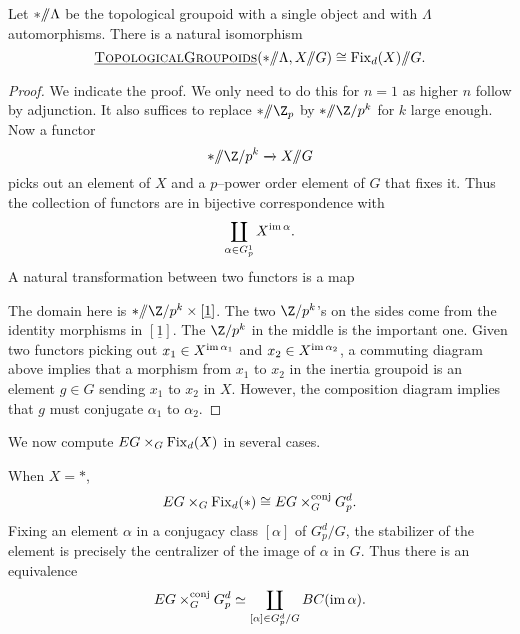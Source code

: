 \begin{lemma} \label{inertialemma}
Let \(\ast /\!\!/ \Lambda\) be the topological groupoid with a single object and with \(\Lambda\) automorphisms. There is a natural isomorphism 
\[
\operatorname{\underline{\smash{\normalfont\textsc{TopologicalGroupoids}}}}(\ast /\!\!/ \Lambda, X /\!\!/ G) \cong \operatorname{Fix}_d(X) /\!\!/ G.
\]
\end{lemma} 
\begin{proof}
We indicate the proof. We only need to do this for \(n=1\) as higher \(n\) follow by adjunction. It also suffices to replace \(\ast \mmod \Z_p\) by \(\ast \mmod \Z/p^k\) for \(k\) large enough. Now a functor
\[
\ast \mmod \Z/p^k \xrightarrow{} X \mmod G
\]
picks out an element of \(X\) and a \(p\)--power order element of \(G\) that fixes it. Thus the collection of functors are in bijective correspondence with
\[
\coprod_{\alpha \in G^{1}_{p}} X^{\operatorname{im} \alpha}.
\]
A natural transformation between two functors is a map
\begin{center}
\end{center}
The domain here is \(\ast \mmod \Z/p^k \times [\underline{1}]\). The two \(\Z/p^k\)'s on the sides come from the identity morphisms in \([\underline{1}]\). The \(\Z/p^k\) in the middle is the important one. Given two functors picking out \(x_1 \in X^{\operatorname{im} \alpha_1}\) and \(x_2 \in X^{\operatorname{im} \alpha_2}\), a commuting diagram above implies that a morphism from \(x_1\) to \(x_2\) in the inertia groupoid is an element \(g \in G\) sending \(x_1\) to \(x_2\) in \(X\). However, the composition diagram implies that \(g\) must conjugate \(\alpha_1\) to \(\alpha_2\).
\end{proof}

We now compute \(EG \times_G \operatorname{Fix}_d(X)\) in several cases.

\begin{example} \label{xapoint2}
When \(X = \ast\),
\[
EG \times_G \operatorname{Fix}_d(\ast) \cong EG \times_{G}^{\text{conj}} G_{p}^{d}.
\]
Fixing an element \(\alpha\) in a conjugacy class \([\alpha]\) of \(G_{p}^{d}/G\), the stabilizer of the element is precisely the centralizer of the image of \(\alpha\) in \(G\). Thus there is an equivalence
\[
EG \times_{G}^{\text{conj}} G_{p}^{d} \simeq \coprod_{[\alpha] \in G_{p}^{d}/G} BC(\operatorname{im} \alpha).
\]
\end{example}

